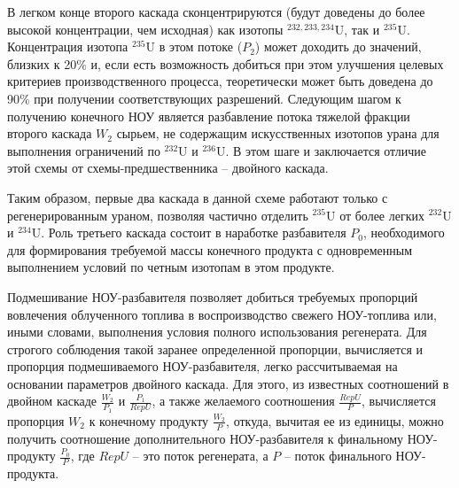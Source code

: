 В легком конце второго каскада сконцентрируются (будут доведены до более высокой концентрации, чем исходная) как изотопы $^{232,233,234}$U, так и $^{235}$U. Концентрация изотопа $^{235}$U в этом потоке ($P_2$) может доходить до значений, близких к 20\% и, если есть возможность добиться при этом улучшения целевых критериев производственного процесса, теоретически может быть доведена до 90\% при получении соответствующих разрешений. Следующим шагом к получению конечного НОУ является разбавление потока тяжелой фракции второго каскада $W_2$ сырьем, не содержащим искусственных изотопов урана для выполнения ограничений по $^{232}$U и $^{236}$U. В этом шаге и заключается отличие этой схемы от схемы-предшественника -- двойного каскада.

Таким образом, первые два каскада в данной схеме работают только с регенерированным ураном, позволяя частично отделить $^{235}$U от более легких $^{232}$U и $^{234}$U. Роль третьего каскада состоит в наработке разбавителя $P_{0}$, необходимого для формирования требуемой массы конечного продукта с одновременным выполнением условий по четным изотопам в этом продукте.

Подмешивание НОУ-разбавителя позволяет добиться требуемых пропорций вовлечения облученного топлива в воспроизводство свежего НОУ-топлива или, иными словами, выполнения условия полного использования регенерата. Для строгого соблюдения такой заранее определенной пропорции, вычисляется и пропорция подмешиваемого НОУ-разбавителя, легко рассчитываемая на основании параметров двойного каскада. Для этого, из известных соотношений в двойном каскаде $\frac{W_{2}}{P_{1}}$ и $\frac{P_{1}}{RepU}$, а также желаемого соотношения $\frac{RepU}{P}$, вычисляется пропорция $W_2$ к конечному продукту $\frac{W_{2}}{P}$, откуда, вычитая ее из единицы, можно получить соотношение дополнительного НОУ-разбавителя к финальному НОУ-продукту $\frac{P_{0}}{P}$, где $RepU$ -- это поток регенерата, а $P$ -- поток финального НОУ-продукта.

